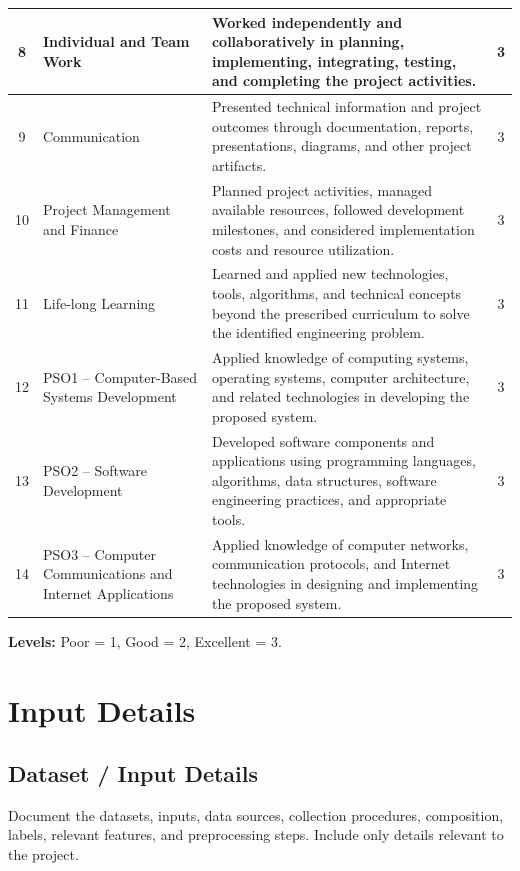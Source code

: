 \begin{appendices}
\begin{longtable}{|c|p{5.2cm}|p{7cm}|c|}
	8 &
	Individual and Team Work &
	Worked independently and collaboratively in planning, implementing,
	integrating, testing, and completing the project activities. &
	3 \\ \hline
	
	9 &
	Communication &
	Presented technical information and project outcomes through
	documentation, reports, presentations, diagrams, and other
	project artifacts. &
	3 \\ \hline
	
	10 &
	Project Management and Finance &
	Planned project activities, managed available resources, followed
	development milestones, and considered implementation costs
	and resource utilization. &
	3 \\ \hline
	
	11 &
	Life-long Learning &
	Learned and applied new technologies, tools, algorithms, and
	technical concepts beyond the prescribed curriculum to solve
	the identified engineering problem. &
	3 \\ \hline
	
	12 &
	PSO1 -- Computer-Based Systems Development &
	Applied knowledge of computing systems, operating systems,
	computer architecture, and related technologies in developing
	the proposed system. &
	3 \\ \hline
	
	13 &
	PSO2 -- Software Development &
	Developed software components and applications using
	programming languages, algorithms, data structures,
	software engineering practices, and appropriate tools. &
	3 \\ \hline
	
	14 &
	PSO3 -- Computer Communications and Internet Applications &
	Applied knowledge of computer networks, communication protocols,
	and Internet technologies in designing and implementing
	the proposed system. &
	3 \\ \hline
	
\end{longtable}

\noindent\textbf{Levels:} Poor = 1, Good = 2, Excellent = 3.




\chapter{Input Details}
\section{Dataset / Input Details}
Document the datasets, inputs, data sources, collection procedures, composition, labels, relevant features, and preprocessing steps. Include only details relevant to the project.


\end{appendices}
